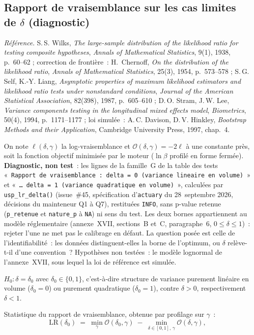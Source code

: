\documentclass[a4paper,11pt]{article}
\newcommand{\code}[1]{\texttt{\small #1}}
\newcommand{\refl}[1]{{\small\textcolor{maincolor!70!black}{\textit{Référence.} #1}}\par\smallskip}
\newcounter{ficheid}
\newenvironment{fiche}[1]{%
  \stepcounter{ficheid}%
  \phantomsection
  \subsection{#1}%
  \label{fiche:\theficheid}%
}{%
  \end{description}\vspace{0.5em}%
}
\newcommand{\Cadre}{%
  \begin{description}[leftmargin=0pt, style=unboxed, itemsep=3pt, topsep=3pt, parsep=2pt]%
  \item[\textcolor{financeblue}{\textbf{1. Cadre, notations et hypothèses de validité (non testées).}}]}
\newcommand{\Hzero}{\item[\textcolor{financeblue}{\textbf{2. Hypothèse nulle.}}]}
\newcommand{\Stat}{\item[\textcolor{financeblue}{\textbf{3. Statistique de test.}}]}
\begin{document}
\begin{fiche}{Rapport de vraisemblance sur les cas limites de $\delta$ (diagnostic)}
\label{fiche:rv-delta}%
\refl{S.\,S. Wilks, \emph{The large-sample distribution of the likelihood ratio for testing
composite hypotheses}, \emph{Annals of Mathematical Statistics}, 9(1), 1938, p.~60--62 ;
correction de frontière~: H.~Chernoff, \emph{On the distribution of the likelihood ratio},
\emph{Annals of Mathematical Statistics}, 25(3), 1954, p.~573--578 ; S.\,G. Self, K.-Y. Liang,
\emph{Asymptotic properties of maximum likelihood estimators and likelihood ratio tests under
nonstandard conditions}, \emph{Journal of the American Statistical Association}, 82(398), 1987,
p.~605--610 ; D.\,O. Stram, J.\,W. Lee,
\emph{Variance components testing in the longitudinal mixed effects model}, \emph{Biometrics},
50(4), 1994, p.~1171--1177 ; loi simulée~: A.\,C. Davison, D.\,V. Hinkley, \emph{Bootstrap Methods
and their Application}, Cambridge University Press, 1997, chap.~4.}
\Cadre
On note $\ell(\delta,\gamma)$ la log-vraisemblance et $\mathcal{O}(\delta,\gamma) = -2\ell$ à une
constante près, soit la fonction objectif minimisée par le moteur ($\ln\beta$ profilé en forme
fermée). \textbf{Diagnostic, non test}~: les lignes de la famille~G de la table des tests
«~\code{Rapport de vraisemblance~: delta = 0 (variance lineaire en volume)}~» et «~\code{\dots~delta = 1
(variance quadratique en volume)}~», calculées par \code{usp\_lr\_delta()} (issue~\#45,
spécification d'\code{actuary} du 28~septembre 2026, décisions du mainteneur Q1 à Q7), restituées
\code{INFO}, sans p-value retenue (\code{p\_retenue} et \code{nature\_p} à \code{NA}) ni sens du
test. Les deux bornes appartiennent au modèle réglementaire (annexe~XVII, sections~B et~C,
paragraphe~6, $0 \le \delta \le 1$)~: rejeter l'une ne met pas le calibrage en défaut. La question
posée est celle de l'identifiabilité~: les données distinguent-elles la borne de l'optimum, ou
$\delta$ relève-t-il d'une convention~? Hypothèses non testées~: le modèle lognormal de
l'annexe~XVII, sous lequel la loi de référence est simulée.
\Hzero
$H_0 : \delta = \delta_0$ avec $\delta_0 \in \{0, 1\}$, c'est-à-dire structure de variance purement
linéaire en volume ($\delta_0 = 0$) ou purement quadratique ($\delta_0 = 1$), contre $\delta > 0$,
respectivement $\delta < 1$.
\Stat
Statistique du rapport de vraisemblance, obtenue par profilage sur $\gamma$~:
\[
  \mathrm{LR}(\delta_0) \;=\; \min_{\gamma}\mathcal{O}(\delta_0,\gamma)
                        \;-\; \min_{\delta\in[0,1],\,\gamma}\mathcal{O}(\delta,\gamma) ,
\]
\end{fiche}
\end{document}
